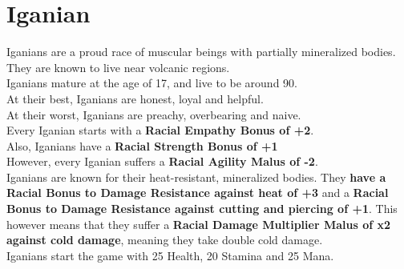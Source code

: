 \section{Iganian}\label{race:iganian}
Iganians are a proud race of muscular beings with partially mineralized bodies.
They are known to live near volcanic regions.\\
Iganians mature at the age of 17, and live to be around 90.\\
At their best, Iganians are honest, loyal and helpful.\\
At their worst, Iganians are preachy, overbearing and naive.\\
Every Iganian starts with a \textbf{Racial Empathy Bonus of +2}.\\
Also, Iganians have a \textbf{Racial Strength Bonus of +1}\\
However, every Iganian suffers a \textbf{Racial Agility Malus of -2}.\\
Iganians are known for their heat-resistant, mineralized bodies.
They \textbf{have a Racial Bonus to Damage Resistance against heat of +3} and a \textbf{Racial Bonus to Damage Resistance against cutting and piercing of +1}.
This however means that they suffer a \textbf{Racial Damage Multiplier Malus of x2 against cold damage}, meaning they take double cold damage.\\
Iganians start the game with 25 Health, 20 Stamina and 25 Mana.